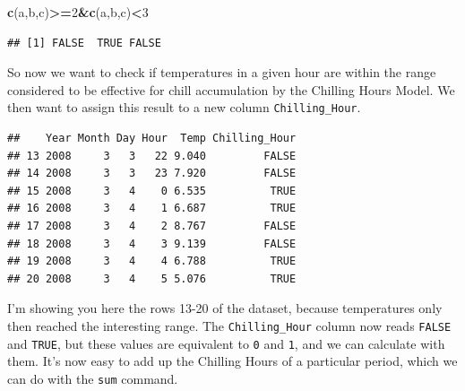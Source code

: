 \documentclass[
]{book}
\newenvironment{Shaded}{\begin{snugshade}}{\end{snugshade}}
\newcommand{\DecValTok}[1]{\textcolor[rgb]{0.00,0.00,0.81}{#1}}
\newcommand{\FloatTok}[1]{\textcolor[rgb]{0.00,0.00,0.81}{#1}}
\newcommand{\KeywordTok}[1]{\textcolor[rgb]{0.13,0.29,0.53}{\textbf{#1}}}
\newcommand{\NormalTok}[1]{#1}
\newcommand{\OperatorTok}[1]{\textcolor[rgb]{0.81,0.36,0.00}{\textbf{#1}}}
\newcommand{\StringTok}[1]{\textcolor[rgb]{0.31,0.60,0.02}{#1}}
\begin{document}
\begin{Shaded}
\begin{Highlighting}[]
\KeywordTok{c}\NormalTok{(a,b,c)}\OperatorTok{>=}\DecValTok{2}\OperatorTok{&}\KeywordTok{c}\NormalTok{(a,b,c)}\OperatorTok{<}\DecValTok{3}
\end{Highlighting}
\end{Shaded}

\begin{verbatim}
## [1] FALSE  TRUE FALSE
\end{verbatim}

So now we want to check if temperatures in a given hour are within the range considered to be effective for chill accumulation by the Chilling Hours Model. We then want to assign this result to a new column \texttt{Chilling\_Hour}.

\begin{Shaded}
\end{Shaded}

\begin{verbatim}
##    Year Month Day Hour  Temp Chilling_Hour
## 13 2008     3   3   22 9.040         FALSE
## 14 2008     3   3   23 7.920         FALSE
## 15 2008     3   4    0 6.535          TRUE
## 16 2008     3   4    1 6.687          TRUE
## 17 2008     3   4    2 8.767         FALSE
## 18 2008     3   4    3 9.139         FALSE
## 19 2008     3   4    4 6.788          TRUE
## 20 2008     3   4    5 5.076          TRUE
\end{verbatim}

I'm showing you here the rows 13-20 of the dataset, because temperatures only then reached the interesting range. The \texttt{Chilling\_Hour} column now reads \texttt{FALSE} and \texttt{TRUE}, but these values are equivalent to \texttt{0} and \texttt{1}, and we can calculate with them. It's now easy to add up the Chilling Hours of a particular period, which we can do with the \texttt{sum} command.

\begin{Shaded}
\end{Shaded}
\end{document}
